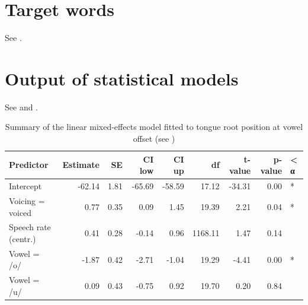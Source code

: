 \documentclass[12pt,]{article}
\begin{document}
\appendix

\hypertarget{target-words}{%
\section{Target words}\label{target-words}}

\label{a:targets}

See .


\hypertarget{output-of-statistical-models}{%
\section{Output of statistical
models}\label{output-of-statistical-models}}

See  and .

\begin{table}[t]

\caption{\label{tab:tra-lm-table}Summary of the linear mixed-effects model fitted to tongue root position at vowel offset (see )}
\centering
\fontsize{8}{10}\selectfont
\begin{tabular}{lrrrrrrrl}
\toprule
Predictor & Estimate & SE & CI low & CI up & df & t-value & p-value & < α\\
\midrule
Intercept & -62.14 & 1.81 & -65.69 & -58.59 & 17.12 & -34.31 & 0.00 & *\\
Voicing = voiced & 0.77 & 0.35 & 0.09 & 1.45 & 19.39 & 2.21 & 0.04 & *\\
Speech rate (centr.) & 0.41 & 0.28 & -0.14 & 0.96 & 1168.11 & 1.47 & 0.14 & \\
Vowel = /o/ & -1.87 & 0.42 & -2.71 & -1.04 & 19.29 & -4.41 & 0.00 & *\\
Vowel = /u/ & 0.09 & 0.43 & -0.75 & 0.92 & 19.70 & 0.20 & 0.84 & \\
\bottomrule
\end{tabular}
\end{table}
\end{document}

